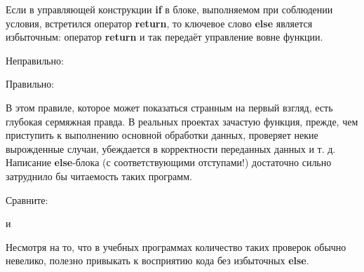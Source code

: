 \begin{typerror}
	\label{TE_if-return-else}

	Если в управляющей конструкции \textbf{if} в блоке, выполняемом при соблюдении условия, встретился оператор \textbf{return}, то ключевое слово \textbf{else} является избыточным: оператор \textbf{return} и так передаёт управление вовне функции.

	Неправильно:

	Правильно:

	В этом правиле, которое может показаться странным на первый взгляд, есть глубокая сермяжная правда.
	В реальных проектах зачастую функция, прежде, чем приступить к выполнению основной обработки данных, проверяет некие вырожденные случаи, убеждается в корректности переданных данных и т. д.
	Написание \textbf{else}-блока (с соответствующими отступами!) достаточно сильно затруднило бы читаемость таких программ.

	Сравните:

	и


	Несмотря на то, что в учебных программах количество таких проверок обычно невелико, полезно привыкать к восприятию кода без избыточных \textbf{else}. 

	

	
\end{typerror}
